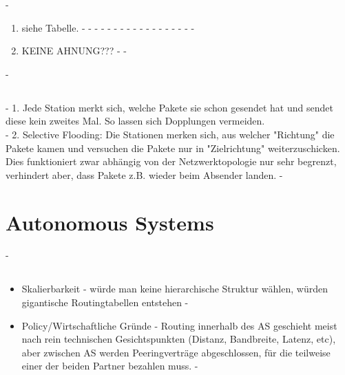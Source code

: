\documentclass[a4paper,
			llpt,
			solution,
			accentcolor=tud2d,
			colorbacktitle
			]
			{tudexercise}
\newcommand{\MiBs}{\mathrm{MiB}/\mathrm{s}}
\newcommand{\8}{$\infty$}
\begin{document}
-\begin{enumerate}
-
-\item siehe Tabelle.
-%
-%
-%
-%
-%
-%
-
-%
-%
-%
-%
-%
-%
-%
-%
-%
-
-\item KEINE AHNUNG???
-
-\end{enumerate}
-\subsection{}
-      1. Jede Station merkt sich, welche Pakete sie schon gesendet hat und sendet diese kein zweites Mal. So lassen sich Dopplungen vermeiden.\\
-      2. Selective Flooding: Die Stationen merken sich, aus welcher "Richtung" die Pakete kamen und versuchen die Pakete nur in "Zielrichtung" weiterzuschicken. Dies funktioniert zwar abhängig von der Netzwerktopologie nur sehr begrenzt, verhindert aber, dass Pakete z.B. wieder beim Absender landen.
-\section{Autonomous Systems}
-\subsection{} \begin{itemize}
-\item Skalierbarkeit - würde man keine hierarchische Struktur wählen, würden gigantische Routingtabellen entstehen
-\item Policy/Wirtschaftliche Gründe - Routing innerhalb des AS geschieht meist nach rein technischen Gesichtspunkten (Distanz, Bandbreite, Latenz, etc), aber zwischen AS werden Peeringverträge abgeschlossen, für die teilweise einer der beiden Partner bezahlen muss.
-\end{itemize}
\end{document}
